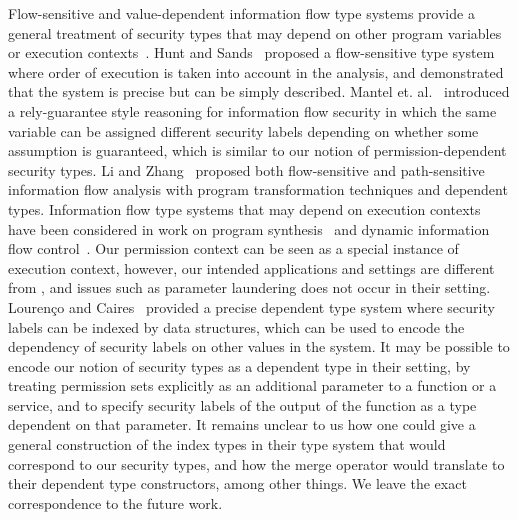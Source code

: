 {{{Flow-sensitive and value-dependent information flow type systems
provide a general treatment of security types that may depend on other
program variables or execution
contexts~\cite{Toby2016csf,Polikarpova16,Dependent_SIFUM_Type_Systems-AFP,Dependent_SIFUM_Refinement-AFP,Murray:2015jm,Li:2016jb,Zhang:2015bc,Li:2015vw,Lourenco:2015:DIF,Lourenco13,Swamy13,Yang12POPL,MantelSS11,Nanevski11,SwamyCC10,Zheng:2007cd,Tse07,Li:csf17,Hunt:2006:FST:1111037.1111045}.
Hunt and Sands~\cite{Hunt:2006:FST:1111037.1111045} proposed a
flow-sensitive type system where order of execution is taken into
account in the analysis, and demonstrated that the system is precise
but can be simply described.
Mantel et. al.~\cite{MantelSS11} introduced a rely-guarantee style
reasoning for information flow security in which the same variable can
be assigned different security labels depending on whether some
assumption is guaranteed, which is similar to our notion of
permission-dependent security types.
Li and Zhang~\cite{Li:csf17} proposed 
both flow-sensitive and path-sensitive information flow analysis with
program transformation techniques and dependent types.
Information flow type systems that may depend on execution contexts
have been considered in work on program synthesis~\cite{Polikarpova16} and
dynamic information flow control~\cite{Yang12POPL}. Our permission context can be seen as a
special instance of execution context, however, our intended
applications and settings are different from \cite{Yang12POPL,Polikarpova16},
and issues such as parameter laundering does not occur in their
setting. 
Louren\c{c}o and Caires~\cite{Lourenco:2015:DIF} provided a precise dependent type
system where security labels can be indexed by data structures, which
can be used to encode the dependency of security labels on other
values in the system.
It may be possible to encode our notion of security types as a
dependent type in their setting, by treating permission sets
explicitly as an additional parameter to a function or a service, and
to specify security labels of the output of the function as a type
dependent on that parameter. It remains unclear to us how
one could give a general construction of the index types in their type
system that would correspond to our security types, and how the merge
operator would translate to their dependent type constructors, among
other things.
We leave the exact correspondence to the future work.


}}}
